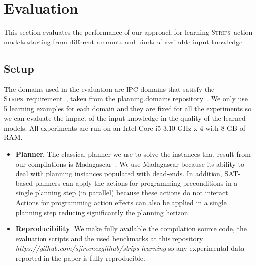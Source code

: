 \documentclass[3p,times]{elsarticle}
\newcommand{\strips}{\textsc{Strips}}     %
\begin{document}
\section{Evaluation}
\label{sec:Section8}
This section evaluates the performance of our approach for learning \strips\ action models starting from different amounts and kinds of available input knowledge.

\subsection{Setup}
The domains used in the evaluation are IPC domains that satisfy the \strips\ requirement~\cite{fox2003pddl2}, taken from the {\sc planning.domains} repository~\cite{muise2016planning}. We only use 5 learning examples for each domain and they are fixed for all the experiments so we can evaluate the impact of the input knowledge in the quality of the learned models. All experiments are run on an Intel Core i5 3.10 GHz x 4 with 8 GB of RAM.
\begin{itemize}
\item {\bf Planner}. The classical planner we use to solve the instances that result from our compilations is {\sc Madagascar}~\cite{rintanen2014madagascar}. We use {\sc Madagascar} because its ability to deal with planning instances populated with dead-ends. In addition, SAT-based planners can apply the actions for programming preconditions in a single planning step (in parallel) because these actions do not interact. Actions for programming action effects can also be applied in a single planning step reducing significantly the planning horizon.
\item {\bf Reproducibility}. We make fully available the compilation source code, the evaluation scripts and the used benchmarks at this repository {\em https://github.com/sjimenezgithub/strips-learning} so any experimental data reported in the paper is fully reproducible.
\end{itemize}
\end{document}
